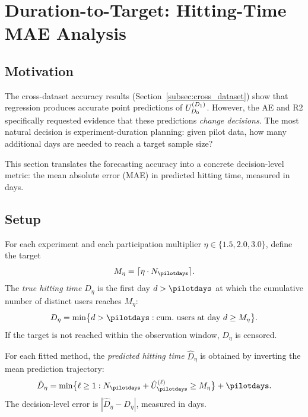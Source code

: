 
\section{Duration-to-Target: Hitting-Time MAE Analysis}
\label{sec:hitting_time}

{\color{green!50!black}

\subsection{Motivation}

The cross-dataset accuracy results (Section~\ref{subsec:cross_dataset})
show that \nbmodel regression produces accurate point predictions of
$U_{D_0}^{(D_1)}$.
However, the AE and R2 specifically requested evidence that these
predictions \emph{change decisions}.
The most natural decision is experiment-duration planning: given pilot
data, how many additional days are needed to reach a target sample size?

This section translates the forecasting accuracy into a concrete
decision-level metric: the mean absolute error (MAE) in predicted
hitting time, measured in days.

\subsection{Setup}

For each experiment and each participation multiplier
$\eta \in \{1.5, 2.0, 3.0\}$, define the target
\[
    M_\eta = \lceil \eta \cdot N_{\pilotdays} \rceil.
\]
The \emph{true hitting time} $D_\eta$ is the first day $d > \pilotdays$
at which the cumulative number of distinct users reaches $M_\eta$:
\[
    D_\eta = \min\bigl\{d > \pilotdays : \text{cum.\ users at day } d \geq M_\eta\bigr\}.
\]
If the target is not reached within the observation window, $D_\eta$
is censored.

For each fitted method, the \emph{predicted hitting time} $\hat D_\eta$
is obtained by inverting the mean prediction trajectory:
\[
    \hat D_\eta = \min\bigl\{\ell \geq 1 :
    N_{\pilotdays} + \hat U_{\pilotdays}^{(\ell)} \geq M_\eta\bigr\}
    + \pilotdays.
\]
The decision-level error is $|\hat D_\eta - D_\eta|$, measured in days.

}
